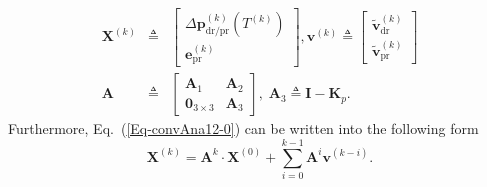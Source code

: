 \begin{eqnarray}
\mathbf{X}^{\left(k\right)} & \triangleq & \left[\begin{array}{c}
\Delta{\mathbf{p}}_{\text{dr/pr}}^{\left(k\right)}\left(T^{\left(k\right)}\right)\\
\mathbf{e}_{\text{pr}}^{(k)}
\end{array}\right],\mathbf{v}^{\left(k\right)}\triangleq\left[\begin{array}{c}
\mathbf{\tilde{v}}_{\text{dr}}^{\left(k\right)}\\
\mathbf{\tilde{v}}_{\text{pr}}^{\left(k\right)}
\end{array}\right]\label{Eq-convAna12-0}\\
\mathbf{A} & \triangleq & \left[\begin{array}{cc}
\mathbf{A}_{1} & \mathbf{A}_{2}\\
\mathbf{0}_{3\times3} & \mathbf{A}_{3}
\end{array}\right],\;\mathbf{A}_{3}\triangleq\mathbf{I}-\mathbf{K}_{p}.\label{Eq-convAna12}
\end{eqnarray}
Furthermore, Eq.\ (\ref{Eq-convAna12-0}) can be written into the
following form
\begin{equation}
\mathbf{X}^{\left(k\right)}=\mathbf{A}^{k}\cdot\mathbf{X}^{\left(0\right)}+\sum_{i=0}^{k-1}\mathbf{A}^{i}\mathbf{v}^{\left(k-i\right)}.\label{eq:xkak}
\end{equation}

